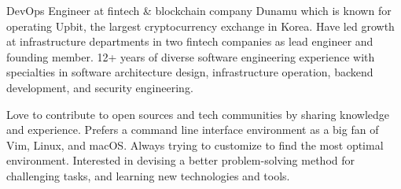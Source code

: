

\begin{cvparagraph}

DevOps Engineer at fintech \& blockchain company Dunamu which is known for operating Upbit, the largest cryptocurrency exchange in Korea. Have led growth at infrastructure departments in two fintech companies as lead engineer and founding member. 12+ years of diverse software engineering experience with specialties in software architecture design, infrastructure operation, backend development, and security engineering.

Love to contribute to open sources and tech communities by sharing knowledge and experience. Prefers a command line interface environment as a big fan of Vim, Linux, and macOS. Always trying to customize to find the most optimal environment. Interested in devising a better problem-solving method for challenging tasks, and learning new technologies and tools.
\end{cvparagraph}
